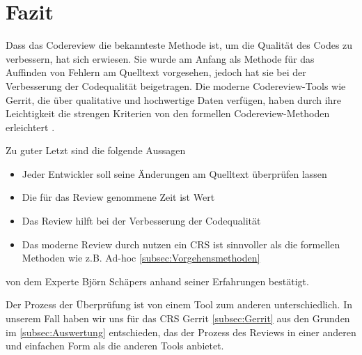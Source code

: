 \section{Fazit}

Dass das Codereview die bekannteste Methode ist, um die Qualität des Codes zu verbessern, hat sich erwiesen. Sie wurde am Anfang als Methode für das Auffinden von Fehlern am Quelltext vorgesehen, jedoch hat sie bei der Verbesserung der Codequalität beigetragen. Die moderne Codereview-Tools wie Gerrit, die über qualitative und hochwertige Daten verfügen, haben durch ihre Leichtigkeit die strengen Kriterien von den formellen Codereview-Methoden erleichtert \cite{mcintosh2016empirical}.

Zu guter Letzt sind die folgende Aussagen 

\begin{itemize}
	\item Jeder Entwickler soll seine Änderungen am Quelltext überprüfen lassen
	\item Die für das Review genommene Zeit ist Wert
	\item Das Review hilft bei der Verbesserung der Codequalität
	\item Das moderne Review durch nutzen ein \ac{CRS} ist sinnvoller als die formellen Methoden wie z.B. Ad-hoc \cref{subsec:Vorgehensmethoden}
\end{itemize}

von dem Experte Björn Schäpers \cite{Bjoern} anhand seiner Erfahrungen bestätigt.

Der Prozess der Überprüfung ist von einem Tool zum anderen unterschiedlich. In unserem Fall haben wir uns für das \ac{CRS} Gerrit \cref{subsec:Gerrit} aus den Grunden im \cref{subsec:Auswertung} entschieden, das der Prozess des Reviews in einer anderen und einfachen Form als die anderen Tools anbietet.

\label{seitenreinschrifft}

